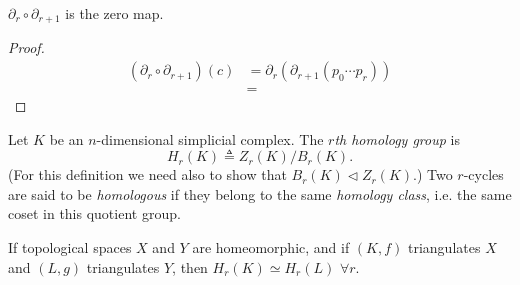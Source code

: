 \begin{lemma}
$\partial_r \circ \partial_{r+1}$ is the zero map.
\end{lemma}
\begin{proof}
\begin{align*}
(\partial_r \circ \partial_{r+1})(c)
&= \partial_r \left(
     \partial_{r+1}
       (p_0 \cdots p_r)
   \right) \\
&=
\end{align*}
\end{proof}

\begin{defn}
Let $K$ be an $n$-dimensional simplicial complex. The
\emph{$r$th homology group} is
$$
H_r(K) \triangleq Z_r(K) / B_r(K).
$$
(For this definition we need also to show that
 $B_r(K) \triangleleft Z_r(K)$.) Two $r$-cycles are said to be
 \emph{homologous} if they belong to the same \emph{homology class},
 i.e. the same coset in this quotient group.
\end{defn}

\begin{theorem}
If topological spaces $X$ and $Y$ are homeomorphic, and if $(K, f)$
triangulates $X$ and $(L, g)$ triangulates $Y$, then
$H_r(K) \simeq H_r(L)$ $\forall r$.
\end{theorem}
